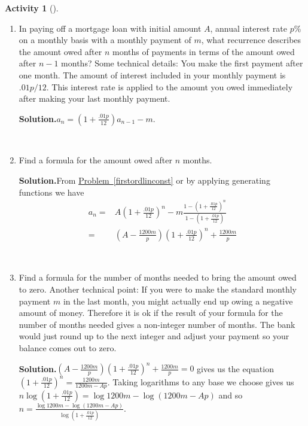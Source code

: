 \documentclass[10pt,]{book}
\theoremstyle{plain}
\theoremstyle{definition}
\newtheorem{activity}[project]{Activity}
\numberwithin{equation}{chapter}
\newcommand{\amp}{&}
\begin{document}
\begin{activity}[]\label{activity-198}
~\par
\begin{enumerate}[label=(\alph*)]
 \item In paying off a mortgage loan with initial amount \(A\), annual interest rate \(p\)\% on a monthly basis with a monthly payment of \(m\), what recurrence describes the amount owed after \(n\) months of payments in terms of the amount owed after \(n-1\) months?  Some technical details: You make the first payment after one month.  The amount of interest included in your monthly payment is \(.01p/12\).  This interest rate is applied to the amount you owed immediately after making your last monthly payment.%
\par\medskip\noindent%
\textbf{Solution.}\quad \(a_n=(1+\frac{.01p}{12})a_{n-1}-m\).%

~\par
\item Find a formula for the amount owed after \(n\) months.%
\par\medskip\noindent%
\textbf{Solution.}\quad From \hyperref[firstordlinconst]{Problem~\ref{firstordlinconst}} or by applying generating functions we have%
\begin{align*}
a_n  =\amp  A(1+\frac{.01p}{12})^n-m\frac{1-(1+\frac{.01p}{12})^n}{1-(1+\frac{.01p}{12})}\\
=\amp  \left(A-\frac{1200m}{p}\right)\left(1+\frac{.01p}{12}\right)^n+\frac{1200m}{p}
\end{align*}
%

~\par
\item Find a formula for the number of months needed to bring the amount owed to zero.  Another technical point: If you were to make the standard monthly payment \(m\) in the last month, you might actually end up owing a negative amount of money.  Therefore it is ok if the result of your formula for the number of months needed gives a non-integer number of months.  The bank would just round up to the next integer and adjust your payment so your balance comes out to zero.%
\par\medskip\noindent%
\textbf{Solution.}\quad \(\left(A-\frac{1200m}{p}\right)\left(1+\frac{.01p}{12}\right)^n+\frac{1200m}{p}=0\) gives us the equation \(\left(1+\frac{.01p}{12}\right)^n=\frac{1200m}{1200m-Ap}\). Taking logarithms to any base we choose gives us \(n\log (1+\frac{.01p}{12})=\log 1200m-\log (1200m-Ap)\) and so \(n=\frac{\log 1200m-\log (1200m-Ap)}{\log (1+\frac{.01p}{12})}\).%


\end{enumerate}
\end{activity}
\end{document}
